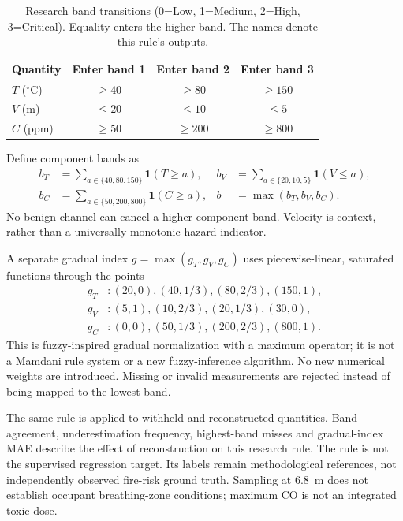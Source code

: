 \documentclass[preprint,12pt,authoryear]{elsarticle}
\begin{document}
\begin{table}[htbp]\centering
\caption{Research band transitions (0=Low, 1=Medium, 2=High, 3=Critical).
Equality enters the higher band. The names denote this rule's outputs.}
\label{tab:bands}
\begin{tabular}{@{}lccc@{}}\toprule
Quantity & Enter band 1 & Enter band 2 & Enter band 3\\\midrule
$T$ ($^{\circ}$C) & $\geq40$ & $\geq80$ & $\geq150$\\
$V$ (m) & $\leq20$ & $\leq10$ & $\leq5$\\
$C$ (ppm) & $\geq50$ & $\geq200$ & $\geq800$\\\bottomrule
\end{tabular}
\end{table}

Define component bands as
\begin{align}
b_T&=\sum_{a\in\{40,80,150\}}\mathbf{1}(T\geq a), &
b_V&=\sum_{a\in\{20,10,5\}}\mathbf{1}(V\leq a),\\
b_C&=\sum_{a\in\{50,200,800\}}\mathbf{1}(C\geq a), &
b&=\max(b_T,b_V,b_C).
\end{align}
No benign channel can cancel a higher component band. Velocity is
context, rather than a universally monotonic hazard indicator.

A separate gradual index $g=\max(g_T,g_V,g_C)$ uses piecewise-linear,
saturated functions through the points
\begin{align}
g_T &: (20,0),(40,1/3),(80,2/3),(150,1),\\
g_V &: (5,1),(10,2/3),(20,1/3),(30,0),\\
g_C &: (0,0),(50,1/3),(200,2/3),(800,1).
\end{align}
This is fuzzy-inspired gradual normalization with a maximum operator;
it is not a Mamdani rule system or a new fuzzy-inference algorithm.
No new numerical weights are introduced. Missing or invalid measurements
are rejected instead of being mapped to the lowest band.

The same rule is applied to withheld and reconstructed quantities.
Band agreement, underestimation frequency, highest-band misses and
gradual-index MAE describe the effect of reconstruction on this research
rule. The rule is not the supervised regression target. Its labels remain
methodological references, not independently observed fire-risk ground truth.
Sampling at 6.8~m does not establish occupant breathing-zone conditions;
maximum CO is not an integrated toxic dose.
\end{document}
